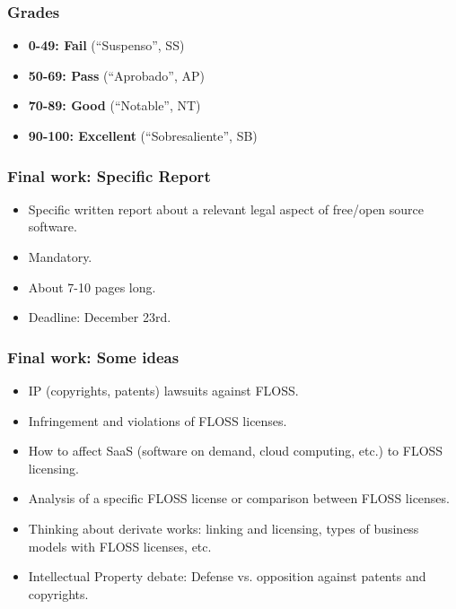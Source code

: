 
\begin{frame}
\frametitle{Grades}

\begin{itemize}
\item \textbf{0-49: Fail} (``Suspenso'', SS)
\item \textbf{50-69: Pass} (``Aprobado'', AP)
\item \textbf{70-89: Good} (``Notable'', NT)
\item \textbf{90-100: Excellent} (``Sobresaliente'', SB)
\end{itemize}

\end{frame}



\begin{frame}
\frametitle{Final work: Specific Report}

\begin{itemize}
\item Specific written report about a relevant legal aspect of free/open source software. 
\item Mandatory.
\item About 7-10 pages long.
\item Deadline: December 23rd.
\end{itemize}

\end{frame}


\begin{frame}
\frametitle{Final work: Some ideas}

\begin{itemize}
\item IP (copyrights, patents) lawsuits against FLOSS.
\item Infringement and violations of FLOSS licenses.
\item How to affect SaaS (software on demand, cloud computing, etc.) to FLOSS licensing.
\item Analysis of a specific FLOSS license or comparison between FLOSS licenses.
\item Thinking about derivate works: linking and licensing, types of business models with FLOSS licenses, etc.
\item Intellectual Property debate: Defense vs. opposition against patents and copyrights.
\end{itemize}

\end{frame}


